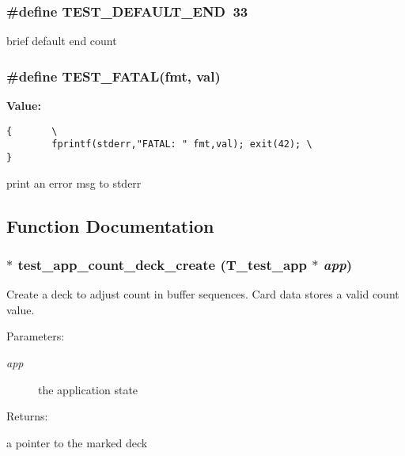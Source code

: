 \subsubsection{\setlength{\rightskip}{0pt plus 5cm}\#define TEST\_\-DEFAULT\_\-END\ 33}\label{group__test__app_a9}


brief default end count 
\subsubsection{\setlength{\rightskip}{0pt plus 5cm}\#define TEST\_\-FATAL(fmt, val)}\label{group__test__app_a14}


{\bf Value:}

\footnotesize\begin{verbatim}{       \
        fprintf(stderr,"FATAL: " fmt,val); exit(42); \
}\end{verbatim}\normalsize 
print an error msg to stderr



\subsection{Function Documentation}
\subsubsection{\setlength{\rightskip}{0pt plus 5cm}{\bf T\_\-deck}$\ast$ test\_\-app\_\-count\_\-deck\_\-create ({\bf T\_\-test\_\-app} $\ast$ {\em app})}\label{group__test__app_a6}


Create a deck to adjust count in buffer sequences. Card data stores a valid count value.

\begin{Desc}
\item[Parameters: ]\par
\begin{description}
\item[{\em 
app}]the application state \end{description}
\end{Desc}
\begin{Desc}
\item[Returns: ]\par
a pointer to the marked deck \end{Desc}
